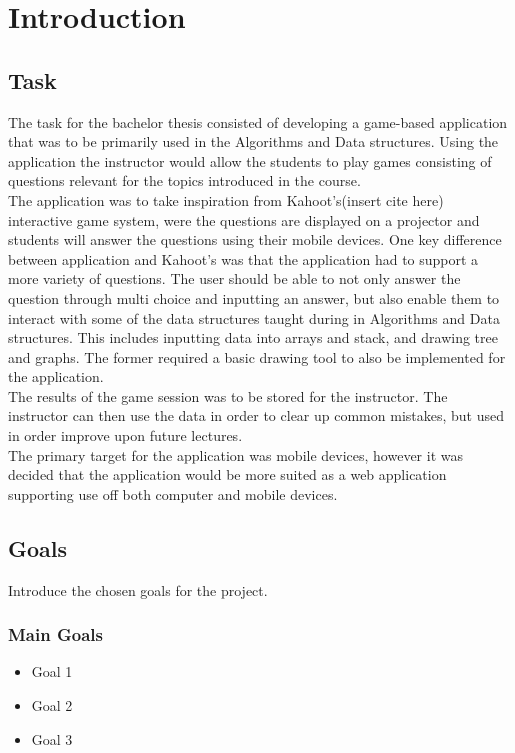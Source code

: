 \section{Introduction}
\subsection{Task}
The task for the bachelor thesis consisted of developing a game-based application that was to be primarily used in the Algorithms and Data structures. Using the application the instructor would allow the students to play games consisting of questions relevant for the topics introduced in the course.\\
The application was to take inspiration from Kahoot's(insert cite here) interactive game system, were the questions are displayed on a projector and students will answer the questions using their mobile devices. One key difference between application and Kahoot's was that the application had to support a more variety of questions. The user should be able to not only answer the question through multi choice and inputting an answer, but also enable them to interact with some of the data structures taught during in Algorithms and Data structures. This includes inputting data into arrays and stack, and drawing tree and graphs. The former required a basic drawing tool to also be implemented for the application.\\ 
The results of the game session was to be stored for the instructor. The instructor can then use the data in order to clear up common mistakes, but used in order improve upon future lectures.\\
The primary target for the application was mobile devices, however it was decided that the application would be more suited as a web application supporting use off both computer and mobile devices. 

\subsection{Goals}
Introduce the chosen goals for the project.
\subsubsection{Main Goals}
\begin{itemize}
\item Goal 1
\item Goal 2
\item Goal 3
\end{itemize}
